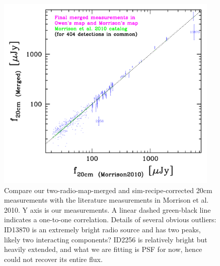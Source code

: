 \documentclass[11pt,a4paper]{article}
\begin{document}
\begin{figure}[H]
	\includegraphics[width=0.95\textwidth]{Compare_measurments_of_20cm_with_Morrison_2010}
	\caption{Compare our two-radio-map-merged and sim-recipe-corrected 20cm measurements with the literature measurements in Morrison et al. 2010. Y axis is our measurements. A linear dashed green-black line indicates a one-to-one correlation. Details of several obvious outliers: ID13870 is an extremely bright radio source and has two peaks, likely two interacting components? ID2256 is relatively bright but heavily extended, and what we are fitting is PSF for now, hence could not recover its entire flux.}
\end{figure}



\end{document}
